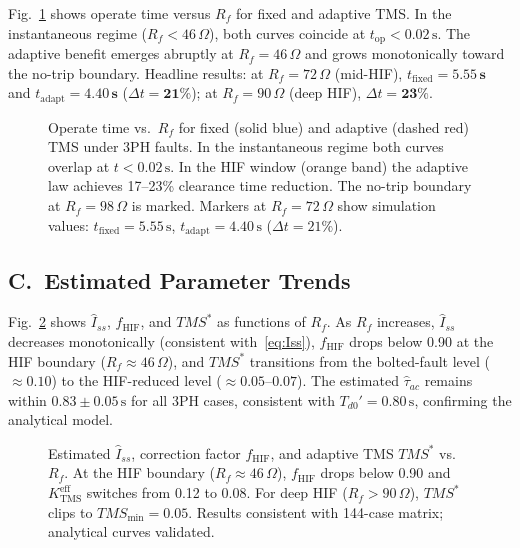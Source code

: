 \documentclass[10pt,journal,twoside]{IEEEtran}
\newcommand{\sss}{\,\text{s}}
\newcommand{\Rf}{R_{\!f}}
\newcommand{\tms}{TMS}
\newcommand{\tmss}{TMS^*}
\newcommand{\Iss}{\hat{I}_{ss}}
\newcommand{\tauac}{\hat{\tau}_{ac}}
\newcommand{\fhif}{f_{\mathrm{HIF}}}
\newcommand{\Keff}{K_{\mathrm{TMS}}^{\mathrm{eff}}}
\begin{document}
Fig.~\ref{fig:triptime} shows operate time versus $\Rf$ for fixed and
adaptive TMS.  In the instantaneous regime ($\Rf < 46\,\Omega$), both curves
coincide at $t_{\mathrm{op}} < 0.02\sss$.  The adaptive benefit emerges
abruptly at $\Rf = 46\,\Omega$ and grows monotonically toward the no-trip
boundary.  Headline results: at $\Rf = 72\,\Omega$ (mid-HIF),
$t_{\mathrm{fixed}} = \mathbf{5.55\sss}$ and
$t_{\mathrm{adapt}} = \mathbf{4.40\sss}$ ($\Delta t = \mathbf{21\%}$);
at $\Rf = 90\,\Omega$ (deep HIF), $\Delta t = \mathbf{23\%}$.

\begin{figure}[!t]
\centering

\caption{Operate time vs.\ $\Rf$ for fixed (solid blue) and adaptive
  (dashed red) TMS under 3PH faults.  In the instantaneous regime both
  curves overlap at $t < 0.02\sss$.  In the HIF window (orange band) the
  adaptive law achieves 17--23\% clearance time reduction.  The no-trip
  boundary at $\Rf = 98\,\Omega$ is marked.
  Markers at $\Rf = 72\,\Omega$ show simulation values: $t_{\mathrm{fixed}}=5.55\sss$,
  $t_{\mathrm{adapt}}=4.40\sss$ ($\Delta t=21\%$).}
\label{fig:triptime}
\end{figure}

\subsection{C.\ Estimated Parameter Trends}
\label{sec:results:params}

Fig.~\ref{fig:est_params} shows $\Iss$, $\fhif$, and $\tmss$ as functions
of $\Rf$.  As $\Rf$ increases, $\Iss$ decreases monotonically (consistent
with~\eqref{eq:Iss}), $\fhif$ drops below 0.90 at the HIF boundary
($\Rf \approx 46\,\Omega$), and $\tmss$ transitions from the bolted-fault
level ($\approx 0.10$) to the HIF-reduced level ($\approx 0.05$--$0.07$).
The estimated $\tauac$ remains within $0.83 \pm 0.05\sss$ for all 3PH cases,
consistent with $T_{d0}' = 0.80\sss$, confirming the analytical model.

\begin{figure}[!t]
\centering

\caption{Estimated $\Iss$, correction factor $\fhif$, and adaptive TMS
  $\tmss$ vs.\ $\Rf$.  At the HIF boundary ($\Rf \approx 46\,\Omega$),
  $\fhif$ drops below 0.90 and $\Keff$ switches from 0.12 to 0.08.
  For deep HIF ($\Rf > 90\,\Omega$), $\tmss$ clips to $\tms_{\min} = 0.05$.
  Results consistent with 144-case matrix; analytical curves validated.}
\label{fig:est_params}
\end{figure}
\end{document}
